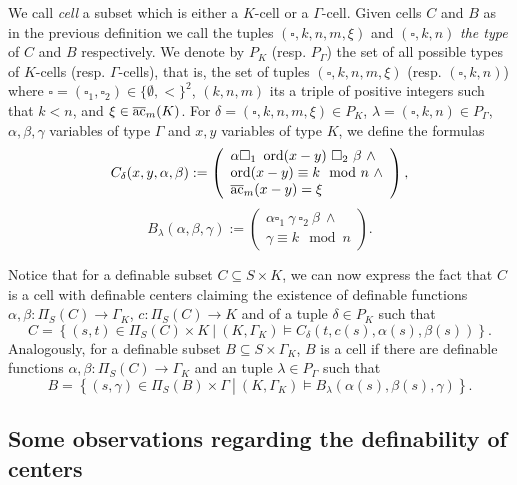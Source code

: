We call \emph{cell} a subset which is either a $K$-cell or a $\Gamma$-cell. Given cells $C$ and $B$ as in the previous definition we call the tuples $(\square,k,n,m,\xi)$ and $(\square,k,n)$ \emph{the type} of $C$ and $B$ respectively. We denote by $P_K$ (resp. $P_\Gamma$) the set of all possible types of $K$-cells (resp. $\Gamma$-cells), that is, the set of tuples $(\square,k,n,m,\xi)$  (resp. $(\square,k,n)$) where $\square = (\square_1, \square_2) \in \{\emptyset, <\}^{2}$, $(k,n,m)$ its a triple of positive integers such that $k<n$, and $\xi\in {\overline{\rm ac}}_{m}(K)$. For $\delta=(\square,k,n,m,\xi)\in P_K$, $\lambda=(\square,k,n)\in P_{\Gamma}$, $\alpha,\beta,\gamma$ variables of type $\Gamma$ and $x,y$ variables of type $K$, we define the formulas
\begin{equation}\label{defKcells}
C_\delta(x,y,\alpha,\beta):= \left(\begin{array}{l} \alpha \square_1 \ \ord(x-y) \ \square_2 \ \beta \ \wedge\\ \ord(x-y) \equiv k\mod n \ \wedge\\ \ac_{m}(x-y) = \xi \end{array} \right),
\end{equation}
\begin{equation}\label{defGammacells}
B_\lambda(\alpha,\beta,\gamma):= \left(\begin{array}{l} \alpha \square_1 \ \gamma \ \square_2 \ \beta \ \wedge \\
\gamma \equiv k\mod n \end{array}\right).
\end{equation}

Notice that for a definable subset $C\subseteq S\times K$, we can now express the fact that $C$ is a cell with definable centers claiming the existence of definable functions $\alpha,\beta:\Pi_S(C)\to\Gamma_K$, $c:\Pi_S(C)\to K$ and of a tuple $\delta\in P_K$ such that 
\[C = \left\{(s,t) \in \Pi_S(C)\times K \ \left| \ (K,\Gamma_K)\models C_\delta(t,c(s),\alpha(s),\beta(s))\right\}\right..
\]
Analogously, for a definable subset $B\subseteq S\times \Gamma_K$, $B$ is a cell if there are definable functions $\alpha,\beta:\Pi_S(C)\to\Gamma_K$ and an tuple $\lambda\in P_\Gamma$ such that  
\[B = \left\{(s,\gamma) \in \Pi_S(B) \times \Gamma \ \left| \ (K,\Gamma_K)\models B_\lambda(\alpha(s),\beta(s),\gamma)\right\}\right..
\]

\subsection{Some observations regarding the definability of centers}

